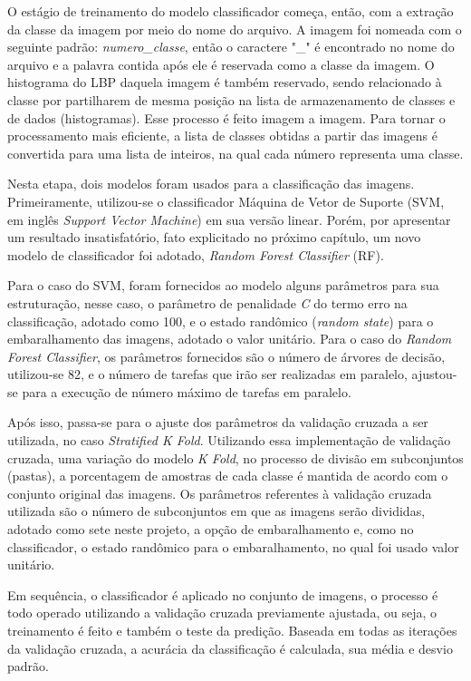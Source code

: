 O estágio de treinamento do modelo classificador começa, então, com a extração da classe da imagem por meio do nome do arquivo. A imagem foi nomeada com o seguinte padrão: \textit{numero\_classe}, então o caractere "\_" {} é encontrado no nome do arquivo e a palavra contida após ele é reservada como a classe da imagem. O histograma do LBP daquela imagem é também reservado, sendo relacionado à classe por partilharem de mesma posição na lista de armazenamento de classes e de dados (histogramas). Esse processo é feito imagem a imagem. Para tornar o processamento mais eficiente, a lista de classes obtidas a partir das imagens é convertida para uma lista de inteiros, na qual cada número representa uma classe.

Nesta etapa, dois modelos foram usados para a classificação das imagens. Primeiramente, utilizou-se o classificador Máquina de Vetor de Suporte (SVM, em inglês \textit{Support Vector Machine}) em sua versão linear. Porém, por apresentar um resultado insatisfatório, fato explicitado no próximo capítulo, um novo modelo de classificador foi adotado, \textit{Random Forest Classifier} (RF).

Para o caso do SVM, foram fornecidos ao modelo alguns parâmetros para sua estruturação, nesse caso, o parâmetro de penalidade \textit{C} do termo erro na classificação, adotado como 100, e o estado randômico (\textit{random state}) para o embaralhamento das imagens, adotado o valor unitário. Para o caso do \textit{Random Forest Classifier}, os parâmetros fornecidos são o número de árvores de decisão, utilizou-se 82, e o número de tarefas que irão ser realizadas em paralelo, ajustou-se para a execução de número máximo de tarefas em paralelo.

Após isso, passa-se para o ajuste dos parâmetros da validação cruzada a ser utilizada, no caso \textit{Stratified K Fold}. Utilizando essa implementação de validação cruzada, uma variação do modelo \textit{K Fold},  no processo de divisão em subconjuntos (pastas), a porcentagem de amostras de cada classe é mantida de acordo com o conjunto original das imagens. Os parâmetros referentes à validação cruzada utilizada são o número de subconjuntos em que as imagens serão divididas, adotado como sete neste projeto, a opção de embaralhamento e, como no classificador, o estado randômico para o embaralhamento, no qual foi usado valor unitário.

Em sequência, o classificador é aplicado no conjunto de imagens, o processo é todo operado utilizando a validação cruzada previamente ajustada, ou seja, o treinamento é feito e também o teste da predição. Baseada em todas as iterações da validação cruzada, a acurácia da classificação é calculada, sua média e desvio padrão.

